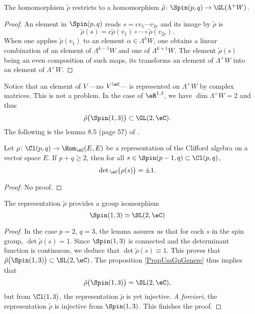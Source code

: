 \begin{proposition}

The homomorphism $\tilde\rho$ restricts to a homomorphism $\tilde\rho\colon \Spin(p,q)\to \GL(\Lambda^+W)$.
\end{proposition}

\begin{proof}
An element in $\Spin(p,q)$ reads $s=cv_1\cdots v_{2r}$ and its image by $\tilde\rho$ is
\[ 
  \tilde\rho(s)=c\tilde\rho(v_1)\circ \cdots \circ\tilde\rho(v_{2r}).
\]
When one applies $\tilde\rho(v_1)$ to an element $\alpha\in\Lambda^kW$, one obtains a linear combination of an element of $\Lambda^{k-1}W$ and one of $\Lambda^{k+1}W$. The element $\tilde\rho(s)$ being an even composition of such maps, its transforms an element of $\Lambda^+W$ into an element of $\Lambda^+W$. 
\end{proof}

Notice that an element of $V$ ---no $V^{\eC}$--- is represented on $\Lambda^+W$ by complex matrices. This is not a problem. In the case of $\eR^{1,3}$, we have $\dim\Lambda^+W=2$ and thus 
\[ 
  \tilde\rho\big( \Spin(1,3) \big)\subset \GL(2,\eC).
\]
The following is the lemma 8.5 (page 57) of \cite{Michelson}.

\begin{lemma}
Let $\rho\colon \Cl(p,q)\to \Hom_{\eC}(E,E)$ be a representation of the Clifford algebra on a vector space $E$. If $p+q\geq 2$, then for all $s\in\Spin(p-1,q)\subset \Cl(p,q) $,
\[ 
  \det{}_{\eC}\big( \rho(s) \big)=\pm 1.
\]

\end{lemma}
\begin{proof}
No proof.
\end{proof}

\begin{theorem}
The representation $\tilde\rho$ provides a group isomorphism 
\[ 
  \Spin(1,3)\simeq \SL(2,\eC)
\]

\end{theorem}

\begin{proof}
In the case $p=2$, $q=3$, the lemma assures us that for each $s$ in the spin group, $\det\tilde\rho(s)=1$. Since $\Spin(1,3)$ is connected and the determinant function is continuous, we deduce that $\det\tilde\rho(s)\equiv 1$. This proves that $\tilde\rho\big( \Spin(1,3) \big)\subset \SL(2,\eC)$. The proposition \ref{PropUssGpGenere} thus implies that
\[ 
  \tilde\rho\big( \Spin(1,3) \big)=\SL(2,\eC),
\]
 but from $\Cl(1,3)$, the representation $\tilde\rho$ is yet injective. \emph{A forciori}, the representation $\tilde\rho$ is injective from $\Spin(1,3)$. This finishes the proof.
\end{proof}


